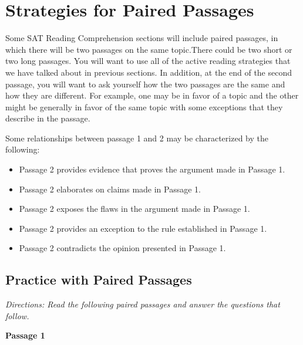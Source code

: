 \section{Strategies for Paired Passages}

Some SAT Reading Comprehension sections will include paired passages, in which there will be two passages on the same topic.There could be two short or two long passages. You will want to use all of the active reading strategies that we have talked about in previous sections. In addition, at the end of the second passage, you will want to ask yourself how the two passages are the same and how they are different. For example, one may be in favor of a topic and the other might be generally in favor of the same topic with some exceptions that they describe in the passage. 

\bigskip
Some relationships between passage 1 and 2 may be characterized by the following:

\begin{itemize}
\item Passage 2 provides evidence that proves the argument made in Passage 1.
\item Passage 2 elaborates on claims made in Passage 1.
\item Passage 2 exposes the flaws in the argument made in Passage 1.
\item Passage 2 provides an exception to the rule established in Passage 1.
\item Passage 2 contradicts the opinion presented in Passage 1.
\end{itemize}

\subsection{Practice with Paired Passages}

\textit{Directions: Read the following paired passages and answer the questions that follow.}

\textbf{Passage 1}

